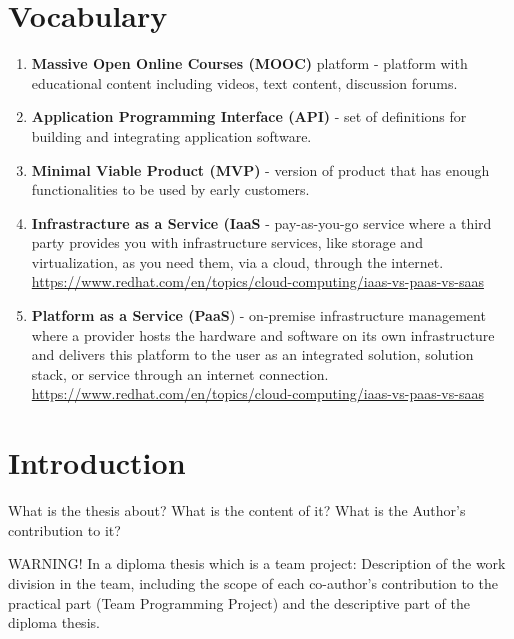 \documentclass[a4paper,11pt,twoside]{report}
\theoremstyle{definition}
\begin{document}

\null\thispagestyle{empty}\newpage
\pagestyle{fancy}
\setcounter{page}{11}

\chapter*{Vocabulary}


\begin{enumerate}
\item \textbf{Massive Open Online Courses (MOOC)} platform - platform with educational content including videos, text content, discussion forums.
\item \textbf{Application Programming Interface (API)} - set of definitions for building and integrating application software.
\item \textbf{Minimal Viable Product (MVP)} - version of product that has enough functionalities to be used by early customers.
\item \textbf{Infrastracture as a Service (IaaS} - pay-as-you-go service where a third party provides you with infrastructure services, like storage and virtualization, as you need them, via a cloud, through the internet. \href{https://www.redhat.com/en/topics/cloud-computing/iaas-vs-paas-vs-saas}{https://www.redhat.com/en/topics/cloud-computing/iaas-vs-paas-vs-saas}
\item \textbf{Platform as a Service (PaaS}) - on-premise infrastructure management where a provider hosts the hardware and software on its own infrastructure and delivers this platform to the user as an integrated solution, solution stack, or service through an internet connection. \href{https://www.redhat.com/en/topics/cloud-computing/iaas-vs-paas-vs-saas}{https://www.redhat.com/en/topics/cloud-computing/iaas-vs-paas-vs-saas}
\end{enumerate}


\chapter*{Introduction}

What is the thesis about? What is the content of it? What is the Author's contribution to it?
\par
WARNING!  In a diploma thesis which is a team project: Description of the work division in the team, including the scope of each co-author’s contribution to the practical part (Team Programming Project) and the descriptive part of the diploma thesis. 
\par
\end{document}
